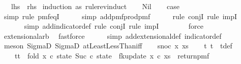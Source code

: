\begin{isabellebody}
\ \ {\isacharparenleft}{\kern0pt}\ {\isachardoublequoteopen}{\isacharquery}{\kern0pt}lhs\ {\isacharequal}{\kern0pt}\ {\isacharquery}{\kern0pt}rhs{\isachardoublequoteclose}{\isacharparenright}{\kern0pt}\isanewline
%
\isadelimproof
%
\endisadelimproof
%
\isatagproof
{}\isamarkupfalse%
\ {\isacharparenleft}{\kern0pt}induction\ as\ rule{\isacharcolon}{\kern0pt}rev{\isacharunderscore}{\kern0pt}induct{\isacharparenright}{\kern0pt}\isanewline
\ \ \isamarkupfalse%
\ Nil\isanewline
\ \ \isamarkupfalse%
\ {\isacharquery}{\kern0pt}case\isanewline
\ \ \ \ \isamarkupfalse%
\ {\isacharparenleft}{\kern0pt}simp{\isacharcomma}{\kern0pt}\ rule\ pmf{\isacharunderscore}{\kern0pt}eqI{\isacharparenright}{\kern0pt}\isanewline
\ \ \ \ \isamarkupfalse%
\ {\isacharparenleft}{\kern0pt}simp\ add{\isacharcolon}{\kern0pt}pmf{\isacharunderscore}{\kern0pt}prod{\isacharunderscore}{\kern0pt}pmf{\isacharparenright}{\kern0pt}\isanewline
\ \ \ \ \isamarkupfalse%
\ {\isacharparenleft}{\kern0pt}rule\ conjI{\isacharcomma}{\kern0pt}\ rule\ impI{\isacharparenright}{\kern0pt}\isanewline
\ \ \ \ \ \isamarkupfalse%
\ {\isacharparenleft}{\kern0pt}simp\ add{\isacharcolon}{\kern0pt}indicator{\isacharunderscore}{\kern0pt}def{\isacharcomma}{\kern0pt}\ rule\ conjI{\isacharcomma}{\kern0pt}\ rule\ impI{\isacharparenright}{\kern0pt}\isanewline
\ \ \ \ \ \ \isamarkupfalse%
\ force\isanewline
\ \ \ \ \ \isamarkupfalse%
\ extensional{\isacharunderscore}{\kern0pt}arb\ \isamarkupfalse%
\ fastforce\isanewline
\ \ \ \ \isamarkupfalse%
\ {\isacharparenleft}{\kern0pt}simp\ add{\isacharcolon}{\kern0pt}extensional{\isacharunderscore}{\kern0pt}def\ indicator{\isacharunderscore}{\kern0pt}def{\isacharparenright}{\kern0pt}\isanewline
\ \ \ \ \isamarkupfalse%
\ {\isacharparenleft}{\kern0pt}meson\ SigmaD{}\ SigmaD{}\ atLeastLessThan{\isacharunderscore}{\kern0pt}iff{\isacharparenright}{\kern0pt}\isanewline
{}\isamarkupfalse%
\isanewline
\ \ \isamarkupfalse%
\ {\isacharparenleft}{\kern0pt}snoc\ x\ xs{\isacharparenright}{\kern0pt}\isanewline
\ \ \isamarkupfalse%
\ t{}\ t{}\ \ t{\isacharunderscore}{\kern0pt}def{\isacharcolon}{\kern0pt}\ \isanewline
\ \ \ \ {\isachardoublequoteopen}{\isacharparenleft}{\kern0pt}t{}{\isacharcomma}{\kern0pt}t{}{\isacharparenright}{\kern0pt}\ {\isacharequal}{\kern0pt}\ fold\ {\isacharparenleft}{\kern0pt}{\isasymlambda}x\ {\isacharparenleft}{\kern0pt}c{\isacharcomma}{\kern0pt}\ state{\isacharparenright}{\kern0pt}{\isachardot}{\kern0pt}\ {\isacharparenleft}{\kern0pt}Suc\ c{\isacharcomma}{\kern0pt}\ state\ {\isasymbind}\ fk{\isacharunderscore}{\kern0pt}update{\isacharprime}{\kern0pt}{\isacharprime}{\kern0pt}\ x\ c{\isacharparenright}{\kern0pt}{\isacharparenright}{\kern0pt}\ xs\ {\isacharparenleft}{\kern0pt}{}{\isacharcomma}{\kern0pt}\ return{\isacharunderscore}{\kern0pt}pmf\ {\isacharparenleft}{\kern0pt}{}{\isacharcomma}{\kern0pt}{}{\isacharparenright}{\kern0pt}{\isacharparenright}{\kern0pt}{\isachardoublequoteclose}\isanewline

\end{isabellebody}
